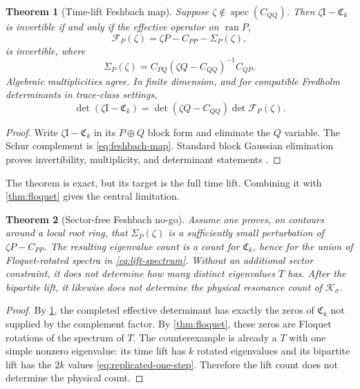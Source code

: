 \documentclass[11pt]{article}
\newtheorem{theorem}{Theorem}[section]
\theoremstyle{definition}
\theoremstyle{remark}
\newcommand{\Id}{\mathrm I}
\newcommand{\cK}{\mathcal K}
\newcommand{\cF}{\mathcal F}
\newcommand{\spec}{\operatorname{spec}}
\begin{document}
\begin{theorem}[Time-lift Feshbach map]
\label{thm:feshbach}
Suppose $\zeta\notin\spec(C_{QQ})$.  Then
$\zeta\Id-\mathfrak C_k$ is invertible if and only if the effective operator
on $\operatorname{ran}P$,
\begin{equation}\label{eq:feshbach-map}
 \cF_P(\zeta)
 =\zeta P-C_{PP}-\Sigma_P(\zeta),
\end{equation}
is invertible, where
\begin{equation}\label{eq:self-energy}
 \boxed{
 \Sigma_P(\zeta)
 =C_{PQ}(\zeta Q-C_{QQ})^{-1}C_{QP}.}
\end{equation}
Algebraic multiplicities agree.  In finite dimension, and for compatible
Fredholm determinants in trace-class settings,
\begin{equation}\label{eq:feshbach-determinant}
 \det(\zeta\Id-\mathfrak C_k)
 =\det(\zeta Q-C_{QQ})\det\cF_P(\zeta).
\end{equation}
\end{theorem}

\begin{proof}
Write $\zeta\Id-\mathfrak C_k$ in its $P\oplus Q$ block form and eliminate
the $Q$ variable.  The Schur complement is
\eqref{eq:feshbach-map}.  Standard block Gaussian elimination proves
invertibility, multiplicity, and determinant statements
\citep{Kato1995,SjoestrandZworski2007}.
\end{proof}

The theorem is exact, but its target is the full time lift.  Combining it
with \cref{thm:floquet} gives the central limitation.

\begin{theorem}[Sector-free Feshbach no-go]
\label{thm:feshbach-no-go}
Assume one proves, on contours around a local root ring, that
$\Sigma_P(\zeta)$ is a sufficiently small perturbation of
$\zeta P-C_{PP}$.  The resulting eigenvalue count is a count for
$\mathfrak C_k$, hence for the union of Floquet-rotated spectra in
\eqref{eq:lift-spectrum}.  Without an additional sector constraint, it does
not determine how many distinct eigenvalues $T$ has.  After the bipartite
lift, it likewise does not determine the physical resonance count of
$\cK_\sigma$.
\end{theorem}

\begin{proof}
By \cref{thm:feshbach}, the completed effective determinant has exactly the
zeros of $\mathfrak C_k$ not supplied by the complement factor.  By
\cref{thm:floquet}, these zeros are Floquet rotations of the spectrum of
$T$.  The counterexample is already a $T$ with one simple nonzero
eigenvalue: its time lift has $k$ rotated eigenvalues and its bipartite lift
has the $2k$ values \eqref{eq:replicated-one-step}.  Therefore the lift count
does not determine the physical count.
\end{proof}
\end{document}
